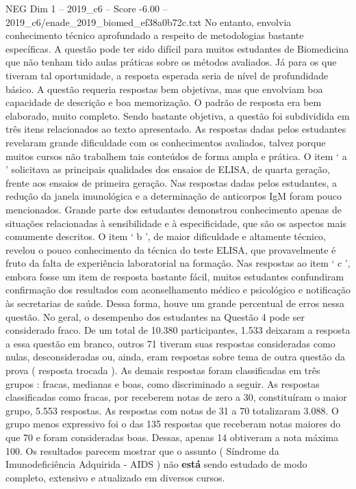 \begin{textsample}{NEG Dim 1 – 2019\_c6 – Score -6.00 – 2019\_c6/enade\_2019\_biomed\_ef38a0b72c.txt}
No entanto, envolvia conhecimento técnico aprofundado a respeito de metodologias bastante específicas.
A questão pode ter sido difícil para muitos estudantes de Biomedicina que não tenham tido aulas práticas sobre os métodos avaliados.
Já para os que tiveram tal oportunidade, a resposta esperada seria de nível de profundidade básico.
A questão requeria respostas bem objetivas, mas que envolviam boa capacidade de descrição e boa memorização.
O padrão de resposta era bem elaborado, muito completo.
Sendo bastante objetiva, a questão foi subdividida em três itens relacionados ao texto apresentado.
As respostas dadas pelos estudantes revelaram grande dificuldade com os conhecimentos avaliados, talvez porque muitos cursos não trabalhem tais conteúdos de forma ampla e prática.
O item ‘ a ’ solicitava as principais qualidades dos ensaios de ELISA, de quarta geração, frente aos ensaios de primeira geração.
Nas respostas dadas pelos estudantes, a redução da janela imunológica e a determinação de anticorpos IgM foram pouco mencionados.
Grande parte dos estudantes demonstrou conhecimento apenas de situações relacionadas à sensibilidade e à especificidade, que são os aspectos mais comumente descritos.
O item ‘ b ’, de maior dificuldade e altamente técnico, revelou o pouco conhecimento da técnica do teste ELISA, que provavelmente é fruto da falta de experiência laboratorial na formação.
Nas respostas ao item ‘ c ’, embora fosse um item de resposta bastante fácil, muitos estudantes confundiram confirmação dos resultados com aconselhamento médico e psicológico e notificação às secretarias de saúde.
Dessa forma, houve um grande percentual de erros nessa questão.
No geral, o desempenho dos estudantes na Questão 4 pode ser considerado fraco.
De um total de 10.380 participantes, 1.533 deixaram a resposta a essa questão em branco, outros 71 tiveram suas respostas consideradas como nulas, desconsideradas ou, ainda, eram respostas sobre tema de outra questão da prova ( resposta trocada ).
As demais respostas foram classificadas em três grupos : fracas, medianas e boas, como discriminado a seguir.
As respostas classificadas como fracas, por receberem notas de zero a 30, constituíram o maior grupo, 5.553 respostas.
As respostas com notas de 31 a 70 totalizaram 3.088.
O grupo menos expressivo foi o das 135 respostas que receberam notas maiores do que 70 e foram consideradas boas.
Dessas, apenas 14 obtiveram a nota máxima 100.
Os resultados parecem mostrar que o assunto ( Síndrome da Imunodeficiência Adquirida - AIDS ) não \textbf{está} sendo estudado de modo completo, extensivo e atualizado em diversos cursos.

\end{textsample}
